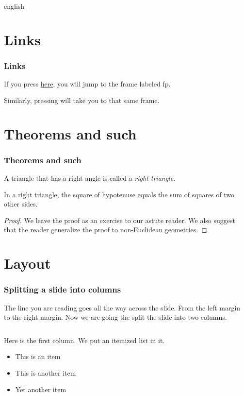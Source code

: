 \documentclass[german,english,mainlanguage=german]{beamer}
\begin{document}
\begin{ufcdlang}{english}

\section{Links}
\begin{frame}\frametitle{Links}
If you press \hyperlink{fp}{here}, you will jump to the frame labeled fp.

Similarly, pressing \hyperlink{fp}{} will take you to that same frame.
\end{frame}

\section[Theorems]{Theorems and such}
\begin{frame}
\frametitle{Theorems and such}
\begin{definition}
A triangle that has a right angle is called a \emph{right triangle}.
\end{definition}
\begin{theorem}
In a right triangle, the square of hypotenuse equals the sum of squares of two other sides.
\end{theorem}
\begin{proof}
We leave the proof as an exercise to our astute reader.
We also suggest that the reader generalize the proof to non-Euclidean geometries.
\end{proof}
\end{frame}

\section{Layout}
\begin{frame}
\frametitle{Splitting a slide into columns}

The line you are reading goes all the way across the slide.
From the left margin to the right margin.  Now we are going
the split the slide into two columns.
\bigskip

\begin{columns}
  \begin{column}{0.5\textwidth}
    Here is the first column.  We put an itemized list in it.
    \begin{itemize}
      \item This is an item
      \item This is another item
      \item Yet another item
    \end{itemize}
  \end{column}


\end{columns}
\end{frame}
\end{ufcdlang}
\end{document}
